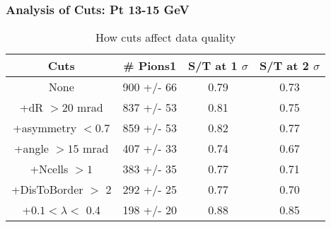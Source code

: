\frame
{
\frametitle{Analysis of Cuts: Pt 13-15 GeV}
\begin{table}
\caption{How cuts affect data quality}
\centering
\begin{tabular}{c c c c}
\hline\hline
Cuts & \# Pions1 & S/T at 1 $\sigma$ & S/T at 2 $\sigma$ \\ [0.5ex]
\hline
None &  900 +/-   66 & 0.79 & 0.73 \\ %
+dR $> 20$ mrad &  837 +/-   53 & 0.81 & 0.75 \\ %
+asymmetry $< 0.7$ &  859 +/-   53 & 0.82 & 0.77 \\ %
+angle $> 15$ mrad &  407 +/-   33 & 0.74 & 0.67 \\ %
+Ncells $> 1$&  383 +/-   35 & 0.77 & 0.71 \\ %
+DisToBorder $>$ 2 &  292 +/-   25 & 0.77 & 0.70 \\ %
+$0.1 < \lambda <$ 0.4 &  198 +/-   20 & 0.88 & 0.85 \\ %
[1ex]
\hline
\end{tabular}
\label{table:nonlin}
\end{table}
}
